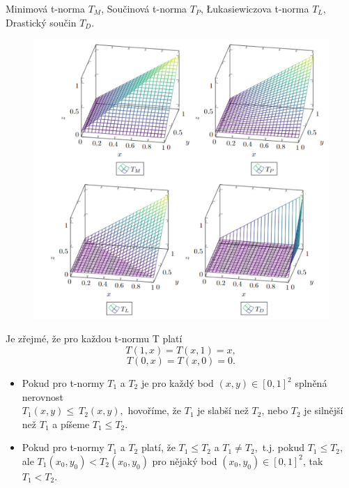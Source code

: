 \begin{graph} Minimová t-norma $T_M$, Součinová t-norma $T_P$, Łukasiewiczova t-norma $T_L$, Drastický součin $T_D$.
   \begin{figure}[H]
    \hspace{-1cm}
        \includegraphics[scale=0.7]{template-fig/t_normy.pdf}
        \centering
    \end{figure}
\end{graph}

\begin{remark}
    Je zřejmé, že pro každou t-normu T platí
    $$T(1,x)=T(x,1)=x,$$
    $$T(0,x)=T(x,0)=0.$$
\end{remark}
\begin{definition}
\cite{KMP}
    \begin{itemize}
        \item Pokud pro t-normy $T_1$ a $T_2$ je
        pro každý bod $(x,y) \in [0,1]^2$ splněná nerovnost\\
        $T_1(x,y)\leq ~T_2(x,y),$ hovo\v ríme, že $T_1$ je slabší než $T_2$,
        nebo $T_2$ je silnější než $T_1$ a píšeme $T_1\leq T_2$.
        \item  Pokud pro t-normy $T_1$ a $T_2$ platí, že $T_1 \leq T_2$ a
        $T_1 \ne T_2,$ t.j. pokud $T_1 \leq T_2$, ale $T_1(x_0,y_0) <
        T_2(x_0,y_0)$ pro nějaký bod $(x_0,y_0) \in [0,1]^2$, tak $T_1<T_2$.
    \end{itemize}
\end{definition}


